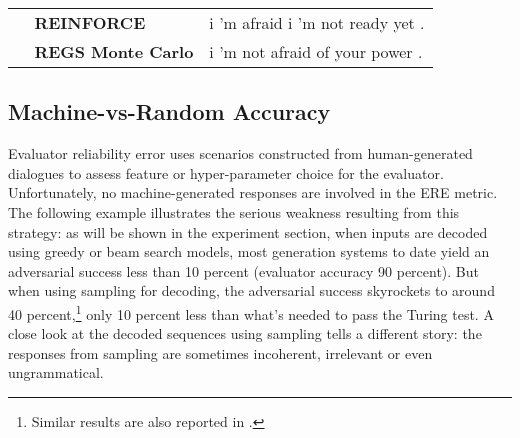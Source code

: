 \begin{table*}[t]
\begin{tabular}{p{4cm}p{11cm}}
{\bf ~~REINFORCE}&i 'm afraid i 'm not ready yet .\\
{\bf ~~REGS Monte Carlo}&i 'm not afraid of your power .\\\hline
\end{tabular}
\caption{Sampled responses from different models. More in Appendix Tables \ref{example-appendix1} and \ref{example-appendix2}.}
\label{example-appendix1}
\end{table*}


\subsection{Machine-vs-Random Accuracy}
Evaluator reliability error uses scenarios constructed from human-generated
dialogues to assess feature or hyper-parameter choice for the evaluator. Unfortunately, no machine-generated responses are involved in the ERE metric. 
The following example illustrates the serious weakness resulting from this strategy:
as will be shown in the experiment section, 
when inputs are decoded using greedy or beam search models,  
most generation systems to date yield an adversarial success less than 10 percent (evaluator accuracy 90 percent). 
But when using sampling for decoding, the adversarial success skyrockets to around 40 percent,\footnote{Similar results are also reported in .} only 10 percent less than what's needed to pass the Turing test. 
A close look at the decoded sequences using sampling tells a different story: the responses from sampling are sometimes incoherent, irrelevant or even ungrammatical. 

